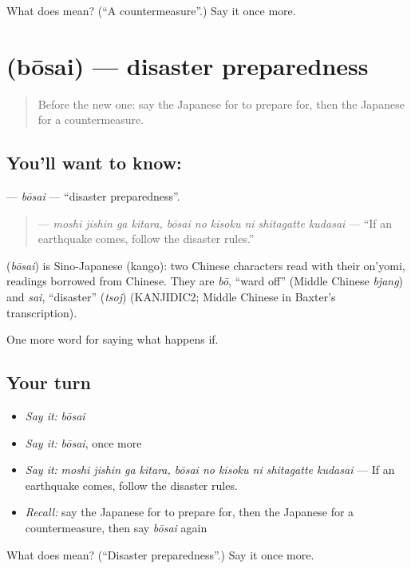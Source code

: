 \begin{tcolorbox}[breakable,colback=teal!4,colframe=teal!35!black,title={Before you move on}]
What does  mean? (\textquotedblleft{}A countermeasure\textquotedblright{}.) Say it once more.
\end{tcolorbox}
\section[\texorpdfstring{\ja{ぼうさい} (bōsai)}{ぼうさい (bōsai)}]{ (bōsai) — disaster preparedness}

\label{lesson:JA-C350-bousai}



\begin{quote}
Before the new one: say the Japanese for to prepare for, then the Japanese for a countermeasure.
\end{quote}

\subsection*{You'll want to know: }
\textbf{} — \emph{bōsai} — \textquotedblleft{}disaster preparedness\textquotedblright{}.

\begin{quote}
\textbf{     } — \emph{moshi jishin ga kitara, bōsai no kisoku ni shitagatte kudasai} — \textquotedblleft{}If an earthquake comes, follow the disaster rules.\textquotedblright{}
\end{quote}

\begin{cousinweb}
\textbf{} (\emph{bōsai}) is Sino-Japanese (kango): two Chinese characters read with their on'yomi, readings borrowed from Chinese. They are \emph{bō}, \textquotedblleft{}ward off\textquotedblright{} (Middle Chinese \emph{bjang}) and \emph{sai}, \textquotedblleft{}disaster\textquotedblright{} (\emph{tsoj}) (KANJIDIC2; Middle Chinese in Baxter's transcription).
\end{cousinweb}

\begin{grammarlens}[title={What you've built}]
One more word for saying what happens if.
\end{grammarlens}

\subsection*{Your turn}
\begin{itemize}
\raggedright
  \item \emph{Say it:} \emph{bōsai}
  \item \emph{Say it:} \emph{bōsai}, once more
  \item \emph{Say it:} \emph{moshi jishin ga kitara, bōsai no kisoku ni shitagatte kudasai} — If an earthquake comes, follow the disaster rules.
  \item \emph{Recall:} say the Japanese for to prepare for, then the Japanese for a countermeasure, then say \emph{bōsai} again
\end{itemize}

\begin{tcolorbox}[breakable,colback=teal!4,colframe=teal!35!black,title={Before you move on}]
What does  mean? (\textquotedblleft{}Disaster preparedness\textquotedblright{}.) Say it once more.
\end{tcolorbox}
